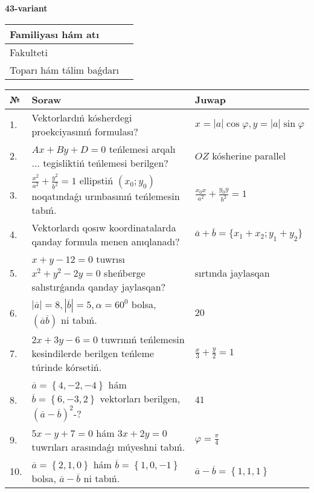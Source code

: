 \documentclass{article}
\begin{document}
\egroup

\newpage


\textbf{43-variant}\\

\bgroup
\def\arraystretch{1.6} %

\begin{tabular}{|m{5.7cm}|m{9.5cm}|}
\hline
Familiyası hám atı & \\
\hline
Fakulteti  & \\
\hline
Toparı hám tálim baǵdarı  & \\
\hline
\end{tabular}

\vspace{1cm}

\begin{tabular}{|m{0.7cm}|m{10cm}|m{4cm}|}
\hline
№ & Soraw & Juwap \\
\hline
1. & Vektorlardıń kósherdegi proekciyasınıń formulası? & $x=|a|\cos\varphi, y=|a|\sin\varphi$ \\
\hline
2. & $Ax+By+D=0$ teńlemesi arqalı ... tegisliktiń teńlemesi berilgen? & $OZ$ kósherine parallel \\
\hline
3. & $\frac{x^2}{a^2}+\frac{y^2}{b^2}=1$ ellipstiń $(x_0;y_0)$ noqatındaǵı urınbasınıń teńlemesin tabıń. & $\frac{x_0x}{a^2}+\frac{y_0y}{b^2}=1$ \\
\hline
4. & Vektorlardı qosıw koordinatalarda qanday formula menen anıqlanadı? & $\overline{a}+\overline{b}=\{x_1+x_2;y_1+y_2\}$ \\
\hline
5. & $x+y-12=0$ tuwrısı $x^{2}+y^{2}-2y=0$ sheńberge salıstırǵanda qanday jaylasqan? & sırtında jaylasqan \\
\hline
6. & $\left| \overline{a} \right|=8, \left| \overline{b} \right|=5, \alpha=60^{0}$ bolsa, $( \overline{a}\overline{b} )$ ni tabıń. & $20$ \\
\hline
7. & $2x+3y-6=0$ tuwrınıń teńlemesin kesindilerde berilgen teńleme túrinde kórsetiń. & $\frac{x}{3} + \frac{ y }{ 2 } =  1$ \\
\hline
8. & $\overline{a}=\left\{ 4,-2,-4 \right\}$ hám $\overline{b}=\left\{ 6,-3, 2 \right\}$ vektorları berilgen, $(\overline{a}-\overline{b}) ^{2}$-? & $41$ \\
\hline
9. & $5x-y+7=0$ hám $3x+2y=0$ tuwrıları arasındaǵı múyeshni tabıń. & $\varphi=\frac{\pi}{4}$ \\
\hline
10. & $\overline{a}=\left\{ 2, 1, 0 \right\}$ hám $\overline{b}=\left\{ 1, 0,-1 \right\}$ bolsa, $\overline{a}-\overline{b}$ ni tabıń. & $\overline{a} -\overline{b} = \left\{ 1,1,1 \right\}$ \\
\hline
\end{tabular}
\end{document}
